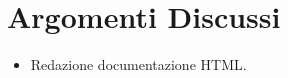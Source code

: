 \section{Argomenti Discussi}
	\begin{itemize}
		\item Redazione documentazione HTML.
	\end{itemize}
